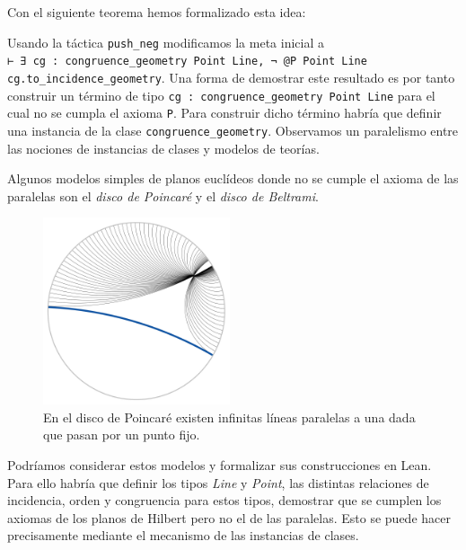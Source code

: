 Con el siguiente teorema hemos formalizado esta idea:


Usando la táctica \lstinline{push_neg} modificamos la meta inicial a\\
\lstinline{⊢ ∃ cg : congruence_geometry Point Line, ¬ @P Point Line cg.to_incidence_geometry}.
Una forma de demostrar este resultado es por tanto construir un término de
tipo \lstinline{cg : congruence_geometry Point Line} para el cual no se cumpla
el axioma \lstinline{P}.
Para construir dicho término habría que definir una instancia de la clase
\lstinline{congruence_geometry}. Observamos un paralelismo entre las nociones de
instancias de clases y modelos de teorías.

Algunos modelos simples de planos euclídeos donde no se cumple el axioma de las
paralelas son el \textit{disco de Poincaré} y el \textit{disco de Beltrami}.

\begin{figure}[htbp]
	\centerline{\includegraphics[width=5.5cm]{./imgs/Poincare_disc_hyperbolic_parallel_lines.png}}
	\caption*{En el disco de Poincaré existen infinitas líneas paralelas a una
		dada que pasan por un punto fijo.}
	\label{figure:poincare}
\end{figure}

Podríamos considerar estos modelos y formalizar sus construcciones en Lean.
Para ello habría que definir los tipos \textit{Line} y \textit{Point}, las
distintas relaciones de incidencia, orden y congruencia para estos tipos,
demostrar que se cumplen los axiomas de los planos de Hilbert pero no el de las
paralelas. Esto se puede hacer precisamente mediante el mecanismo de las
instancias de clases.

